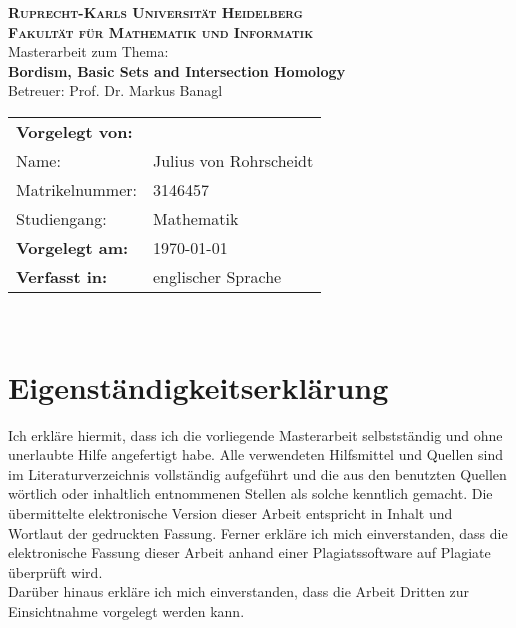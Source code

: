 \documentclass{scrreprt}
\begin{document}
\begin{titlepage}
    \begin{center}
    \LARGE\textbf{\textsc{Ruprecht-Karls Universit\"at Heidelberg}}\\ 
    \vspace{0,1cm}
    \large\textbf{\textsc{Fakult\"at f\"ur Mathematik und Informatik}}\\
    \vspace{6cm}
    \LARGE{{Masterarbeit zum Thema:}}\\
    \vspace{0,3cm}
    \huge \textbf{\textsf{Bordism, Basic Sets and Intersection Homology}} \\
    \vspace{1,5cm}
    \large Betreuer: Prof. Dr. Markus Banagl
    \vspace{4cm}
    \end{center}
 \normalsize{
    \begin{tabular}{ll}
		\textbf{Vorgelegt von:} \\
		Name: & Julius von Rohrscheidt   \\  	
    	Matrikelnummer: & {3146457} \\
    	\vspace{0,2cm}
    	Studiengang: & Mathematik\\
    	\textbf{Vorgelegt am:}  &\today \\
    	\vspace{0,2cm} 
    	\textbf{Verfasst in:} &englischer Sprache \\
    \end{tabular}\\
    }
\end{titlepage}


\section*{Eigenst\"andigkeitserkl\"arung}
\vspace{15mm}
 
Ich erkl\"are hiermit, dass ich die vorliegende Masterarbeit
selbstst\"andig und ohne unerlaubte Hilfe angefertigt habe. Alle
verwendeten Hilfsmittel und Quellen sind im Literaturverzeichnis
vollst\"andig aufgef\"uhrt und die aus den benutzten Quellen w\"ortlich oder
inhaltlich entnommenen Stellen als solche kenntlich gemacht. Die \"ubermittelte
elektronische Version dieser Arbeit entspricht in Inhalt und Wortlaut der gedruckten Fassung. Ferner erkl\"are ich mich einverstanden, dass die elektronische Fassung dieser Arbeit anhand einer Plagiatssoftware auf Plagiate \"uberpr\"uft wird. \\
Dar\"uber hinaus erkl\"are ich mich einverstanden, dass die Arbeit Dritten zur Einsichtnahme vorgelegt werden kann.
\end{document}
